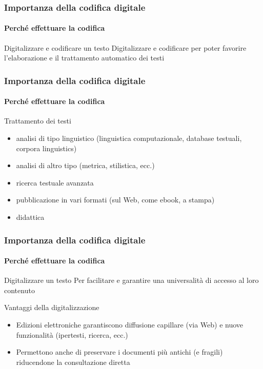 
\begin{frame}
	\frametitle{Importanza della codifica digitale}
	\framesubtitle{Perché effettuare la codifica}
	\addtocounter{nframe}{1}

	\begin{block}{Digitalizzare e codificare un testo}
		Digitalizzare e codificare per poter favorire l'elaborazione e il trattamento automatico dei testi
	\end{block}
\end{frame}

\begin{frame}
	\frametitle{Importanza della codifica digitale}
	\framesubtitle{Perché effettuare la codifica}
	\addtocounter{nframe}{1}

	\begin{block}{Trattamento dei testi}
		\begin{itemize}
			\item  analisi di tipo linguistico (linguistica computazionale,
			      database testuali, corpora linguistics)
			\item analisi di altro tipo (metrica, stilistica, ecc.)
			\item ricerca testuale avanzata
			\item pubblicazione in vari formati (sul Web, come ebook, a
			      stampa)
			\item didattica
		\end{itemize}

	\end{block}
\end{frame}


\begin{frame}
	\frametitle{Importanza della codifica digitale}
	\framesubtitle{Perché effettuare la codifica}
	\addtocounter{nframe}{1}

	\begin{block}{Digitalizzare un testo}
		Per facilitare e garantire una universalità di accesso al loro contenuto
	\end{block}

	\begin{block}{Vantaggi della digitalizzazione}
		\begin{itemize}
			\item Edizioni elettroniche garantiscono diffusione capillare
			      (via Web) e nuove funzionalità (ipertesti, ricerca, ecc.)
			\item Permettono anche di preservare i documenti più antichi
			      (e fragili) riducendone la consultazione diretta
		\end{itemize}
	\end{block}
\end{frame}

